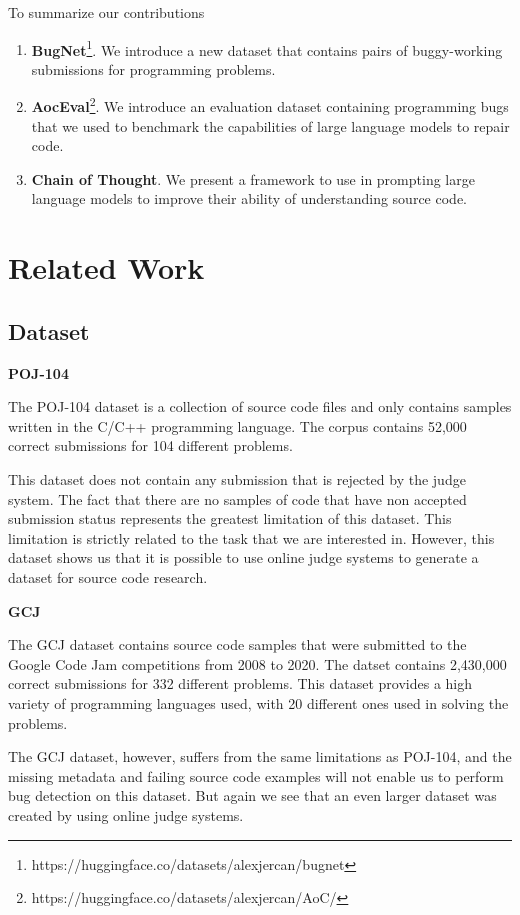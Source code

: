 \documentclass[12pt,a4paper]{report}
\begin{document}
To summarize our contributions

\begin{enumerate}
  \item \textbf{BugNet}\footnote{https://huggingface.co/datasets/alexjercan/bugnet}. We introduce a new dataset that contains pairs of buggy-working submissions for programming problems.
  \item \textbf{AocEval}\footnote{https://huggingface.co/datasets/alexjercan/AoC/}. We introduce an evaluation dataset containing programming bugs that we used to benchmark the capabilities of large language models to repair code.
  \item \textbf{Chain of Thought}. We present a framework to use in prompting large language models to improve their ability of understanding source code. 
\end{enumerate}

\chapter{Related Work}

\section{Dataset}

\textbf{POJ-104}

The POJ-104 \cite{mou2015convolutional} dataset is a collection of source code files and only contains samples written in the C/C++ programming language. The corpus contains 52,000 correct submissions for 104 different problems. 

This dataset does not contain any submission that is rejected by the judge system. The fact that there are no samples of code that have non accepted submission status represents the greatest limitation of this dataset. This limitation is strictly related to the task that we are interested in. However, this dataset shows us that it is possible to use online judge systems to generate a dataset for source code research.

\textbf{GCJ}

The GCJ dataset contains source code samples that were submitted to the Google Code Jam competitions from 2008 to 2020. The datset contains 2,430,000 correct submissions for 332 different problems. This dataset provides a high variety of programming languages used, with 20 different ones used in solving the problems.

The GCJ dataset, however, suffers from the same limitations as POJ-104, and the missing metadata and failing source code examples will not enable us to perform bug detection on this dataset. But again we see that an even larger dataset was created by using online judge systems.
\end{document}
